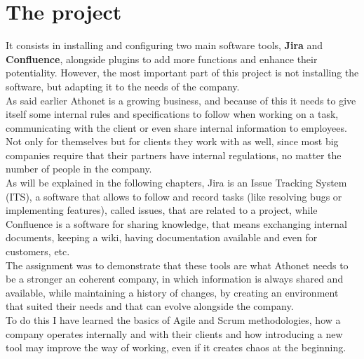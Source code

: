 \section{The project}
	It consists in installing and configuring two main software tools, \textbf{Jira} and \textbf{Confluence}, alongside plugins to add more functions and enhance their potentiality.
	However, the most important part of this project is not installing the software, but adapting it to the needs of the company.\\
	As said earlier Athonet is a growing business, and because of this it needs to give itself some internal rules and specifications to follow when working on a task, communicating with the client or even share internal information to employees.
	Not only for themselves but for clients they work with as well, since most big companies require that their partners have internal regulations, no matter the number of people in the company.\\
	As will be explained in the following chapters, Jira is an Issue Tracking System (ITS), a software that allows to follow and record tasks (like resolving bugs or implementing features), called issues, that are related to a project, while Confluence is a software for sharing knowledge, that means exchanging internal documents, keeping a wiki, having documentation available and even for customers, etc.\\
	The assignment was to demonstrate that these tools are what Athonet needs to be a stronger an coherent company, in which information is always shared and available, while maintaining a history of changes, by creating an environment that suited their needs and that can evolve alongside the company.\\
	To do this I have learned the basics of Agile and Scrum methodologies, how a company operates internally and with their clients and how introducing a new tool may improve the way of working, even if it creates chaos at the beginning.

